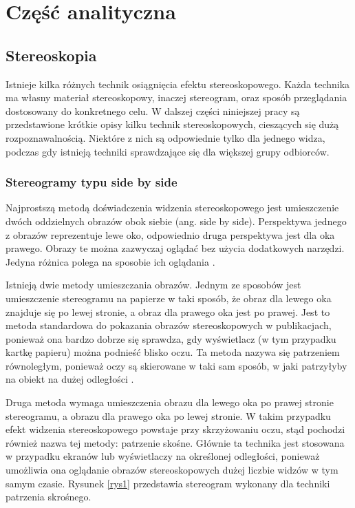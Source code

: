 \newpage
\section[Część analityczna]{Część analityczna}
\subsection{Stereoskopia}
Istnieje kilka różnych technik osiągnięcia efektu stereoskopowego. Każda technika ma własny materiał stereoskopowy, inaczej stereogram, oraz sposób przeglądania dostosowany do konkretnego celu. W dalszej części niniejszej pracy są przedstawione krótkie opisy kilku technik stereoskopowych, cieszących się dużą rozpoznawalnością. Niektóre z nich są odpowiednie tylko dla jednego widza, podczas gdy istnieją techniki sprawdzające się dla większej grupy odbiorców.

\subsubsection{Stereogramy typu side by side}
Najprostszą metodą doświadczenia widzenia stereoskopowego jest umieszczenie dwóch oddzielnych obrazów obok siebie (ang. side by side). Perspektywa jednego z obrazów reprezentuje lewe oko, odpowiednio druga perspektywa jest dla oka prawego. Obrazy te można zazwyczaj oglądać bez użycia dodatkowych narzędzi. Jedyna różnica polega na sposobie ich oglądania \cite{stereoscopythesis}. 

Istnieją dwie metody umieszczania obrazów. Jednym ze sposobów jest umieszczenie stereogramu na papierze w taki sposób, że obraz dla lewego oka znajduje się po lewej stronie, a obraz dla prawego oka jest po prawej. Jest to metoda standardowa do pokazania obrazów stereoskopowych w publikacjach, ponieważ ona bardzo dobrze się sprawdza, gdy wyświetlacz (w tym przypadku kartkę papieru) można podnieść blisko oczu. Ta metoda nazywa się patrzeniem równoległym, ponieważ oczy są skierowane w taki sam sposób, w jaki patrzyłyby na obiekt na dużej odległości \cite{sidebysideinfo}.

Druga metoda wymaga umieszczenia obrazu dla lewego oka po prawej stronie stereogramu, a obrazu dla prawego oka po lewej stronie. W takim przypadku efekt widzenia stereoskopowego powstaje przy skrzyżowaniu oczu, stąd pochodzi również nazwa tej metody: patrzenie skośne. Głównie ta technika jest stosowana w przypadku ekranów lub wyświetlaczy na określonej odległości, ponieważ umożliwia ona oglądanie obrazów stereoskopowych dużej liczbie widzów w tym samym czasie\cite{sidebysideinfo}. Rysunek \ref{rys1} przedstawia stereogram wykonany dla techniki patrzenia skrośnego.

